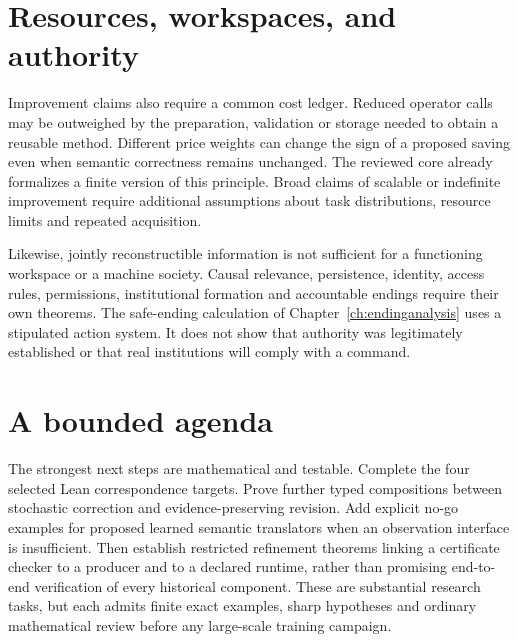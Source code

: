 \section{Resources, workspaces, and authority}
Improvement claims also require a common cost ledger. Reduced operator calls may be outweighed by the preparation, validation or storage needed to obtain a reusable method. Different price weights can change the sign of a proposed saving even when semantic correctness remains unchanged. The reviewed core already formalizes a finite version of this principle. Broad claims of scalable or indefinite improvement require additional assumptions about task distributions, resource limits and repeated acquisition.

Likewise, jointly reconstructible information is not sufficient for a functioning workspace or a machine society. Causal relevance, persistence, identity, access rules, permissions, institutional formation and accountable endings require their own theorems. The safe-ending calculation of Chapter~\ref{ch:endinganalysis} uses a stipulated action system. It does not show that authority was legitimately established or that real institutions will comply with a command.

\section{A bounded agenda}
The strongest next steps are mathematical and testable. Complete the four selected Lean correspondence targets. Prove further typed compositions between stochastic correction and evidence-preserving revision. Add explicit no-go examples for proposed learned semantic translators when an observation interface is insufficient. Then establish restricted refinement theorems linking a certificate checker to a producer and to a declared runtime, rather than promising end-to-end verification of every historical component. These are substantial research tasks, but each admits finite exact examples, sharp hypotheses and ordinary mathematical review before any large-scale training campaign.
